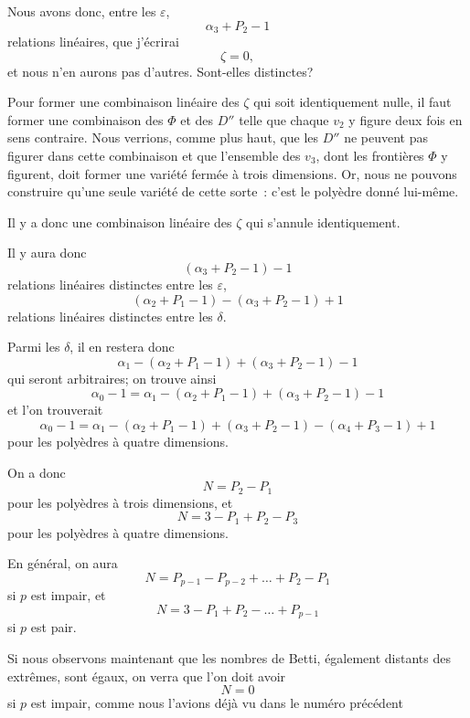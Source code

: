 \documentclass{article}
\begin{document}
Nous avons donc, entre les $\varepsilon$,
\[ \alpha_{3} + P_{2} - 1 \]
relations linéaires, que j'écrirai
\[ \zeta = 0, \]
et nous n'en aurons pas d'autres. Sont-elles distinctes?

Pour former une combinaison linéaire des $\zeta$ qui soit identiquement nulle, il faut former une combinaison des $\Phi$ et des $D''$ telle que chaque $v_{2}$ y figure deux fois en sens contraire. Nous verrions, comme plus haut, que les $D''$ ne peuvent pas figurer dans cette combinaison et que l'ensemble des $v_{3}$, dont les frontières $\Phi$ y figurent, doit former une variété fermée à trois dimensions. Or, nous ne pouvons construire qu'une seule variété de cette sorte~: c'est le polyèdre donné lui-même.

Il y a donc une combinaison linéaire des $\zeta$ qui s'annule identiquement.

Il y aura donc
\[ (\alpha_{3} + P_{2} - 1) - 1 \]
relations linéaires distinctes entre les $\varepsilon$,
\[ (\alpha_{2} + P_{1} - 1) - (\alpha_{3} + P_{2} - 1) + 1 \]
relations linéaires distinctes entre les $\delta$.

Parmi les $\delta$, il en restera donc
\[ \alpha_{1} - (\alpha_{2} + P_{1} - 1) + (\alpha_{3} + P_{2} - 1) - 1 \]
qui seront arbitraires; on trouve ainsi
\[ \alpha_{0} - 1 = \alpha_{1} - (\alpha_{2} + P_{1} - 1) + (\alpha_{3} + P_{2} - 1) - 1 \]
et l'on trouverait
\[ \alpha_{0} - 1 = \alpha_{1} - (\alpha_{2} + P_{1} - 1) + (\alpha_{3} + P_{2} - 1) - (\alpha_{4} + P_{3} - 1) + 1 \]
pour les polyèdres à quatre dimensions.

On a donc
\[ N = P_{2} - P_{1} \]
pour les polyèdres à trois dimensions, et
\[ N = 3 - P_{1} + P_{2} - P_{3} \]
pour les polyèdres à quatre dimensions.

En général, on aura
\[ N = P_{p-1} - P_{p-2} + \ldots + P_{2} - P_{1} \]
si $p$ est impair, et
\[ N = 3 - P_{1} + P_{2} - \ldots + P_{p-1} \]
si $p$ est pair.

Si nous observons maintenant que les nombres de Betti, également distants des extrêmes, sont égaux, on verra que l'on doit avoir
\[ N = 0 \]
si $p$ est impair, comme nous l'avions déjà vu dans le numéro précédent
\end{document}
